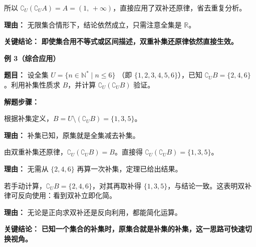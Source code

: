 \begin{examplebox}
\begin{description}[style=nextline, leftmargin=2.8em, labelsep=0.5em, itemsep=0.45em]
		\item[\textbf{第三步（结论确认）：}] 所以 $\complement_U(\complement_U A) = A = (1,\,+\infty)$，直接应用了双补还原律，省去重复分析。
			\par\textbf{理由：}
			无限集合情形下，结论依然成立，只需注意全集是 $\mathbb{R}$。
	\end{description}

	\textbf{\textcolor{CExample}{关键结论：}}
	\textbf{即使集合用不等式或区间描述，双重补集还原律依然直接生效。}

	\medskip
	\textbf{\textcolor{CExample}{例 3（综合应用）}}

	\textbf{\textcolor{CExample}{题目：}}
	设全集 $U=\{n\in\mathbb{N}^* \mid n\le 6\}$ （即 $\{1,2,3,4,5,6\}$），已知 $\complement_U B = \{2,4,6\}$。利用补集性质求 $B$，并计算 $\complement_U(\complement_U B)$ 验证。

	\textbf{\textcolor{CExample}{解题步骤：}}
	\begin{description}[style=nextline, leftmargin=2.8em, labelsep=0.5em, itemsep=0.45em]
		\item[\textbf{第一步（反求原集）：}] 根据补集定义，$B = U \setminus (\complement_U B) = \{1,3,5\}$。
			\par\textbf{理由：}
			补集已知，原集就是全集减去补集。

		\item[\textbf{第二步（利用双补律）：}] 由双重补集还原律，$\complement_U(\complement_U B) = B$。直接得 $\complement_U(\complement_U B) = \{1,3,5\}$。
			\par\textbf{理由：}
			无需从 $\{2,4,6\}$ 再算一次补集，定理已给出结果。

		\item[\textbf{第三步（双重验证）：}] 若手动计算，$\complement_U B = \{2,4,6\}$，对其再取补得 $\{1,3,5\}$，与结论一致。这表明双补律可反向使用：看到双补立即化简。
			\par\textbf{理由：}
			无论是正向求双补还是反向利用，都能简化运算。
	\end{description}

	\textbf{\textcolor{CExample}{关键结论：}}
	\textbf{已知一个集合的补集时，原集合就是补集的补集，这一思路可快速切换视角。}
\end{examplebox}

